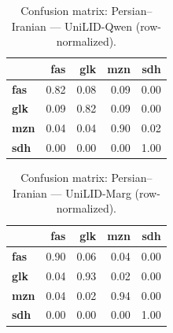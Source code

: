 \begin{table}[htbp]
\centering
\small
\begin{tabular}{lrrrr}
\toprule
 & \textbf{fas} & \textbf{glk} & \textbf{mzn} & \textbf{sdh} \\
\midrule
\textbf{fas} & \cellcolor{blue!82}\color{white}0.82 & \cellcolor{blue!8}0.08 & \cellcolor{blue!9}0.09 & \cellcolor{blue!0}0.00 \\
\textbf{glk} & \cellcolor{blue!8}0.09 & \cellcolor{blue!82}\color{white}0.82 & \cellcolor{blue!8}0.09 & \cellcolor{blue!0}0.00 \\
\textbf{mzn} & \cellcolor{blue!3}0.04 & \cellcolor{blue!3}0.04 & \cellcolor{blue!90}\color{white}0.90 & \cellcolor{blue!1}0.02 \\
\textbf{sdh} & \cellcolor{blue!0}0.00 & \cellcolor{blue!0}0.00 & \cellcolor{blue!0}0.00 & \cellcolor{blue!100}\color{white}1.00 \\
\bottomrule
\end{tabular}
\caption{Confusion matrix: Persian--Iranian — UniLID-Qwen (row-normalized).}
\label{tab:cm-persian_iranian-unilid-qwen}
\end{table}

\begin{table}[htbp]
\centering
\small
\begin{tabular}{lrrrr}
\toprule
 & \textbf{fas} & \textbf{glk} & \textbf{mzn} & \textbf{sdh} \\
\midrule
\textbf{fas} & \cellcolor{blue!89}\color{white}0.90 & \cellcolor{blue!5}0.06 & \cellcolor{blue!4}0.04 & \cellcolor{blue!0}0.00 \\
\textbf{glk} & \cellcolor{blue!4}0.04 & \cellcolor{blue!93}\color{white}0.93 & \cellcolor{blue!2}0.02 & \cellcolor{blue!0}0.00 \\
\textbf{mzn} & \cellcolor{blue!3}0.04 & \cellcolor{blue!1}0.02 & \cellcolor{blue!94}\color{white}0.94 & \cellcolor{blue!0}0.00 \\
\textbf{sdh} & \cellcolor{blue!0}0.00 & \cellcolor{blue!0}0.00 & \cellcolor{blue!0}0.00 & \cellcolor{blue!100}\color{white}1.00 \\
\bottomrule
\end{tabular}
\caption{Confusion matrix: Persian--Iranian — UniLID-Marg (row-normalized).}
\label{tab:cm-persian_iranian-unilid-marg}
\end{table}

